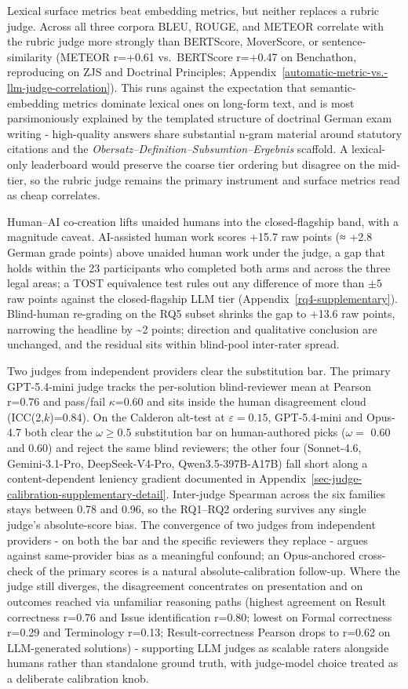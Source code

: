 \documentclass[11pt]{article}
\begin{document}
Lexical surface metrics beat embedding metrics, but neither replaces a
rubric judge. Across all three corpora BLEU, ROUGE, and METEOR correlate
with the rubric judge more strongly than BERTScore, MoverScore, or
sentence-similarity (METEOR r=+0.61 vs.~BERTScore r=+0.47 on Benchathon,
reproducing on ZJS and Doctrinal Principles;
Appendix~\ref{automatic-metric-vs.-llm-judge-correlation}). This runs
against the expectation that semantic-embedding metrics dominate lexical
ones on long-form text, and is most parsimoniously explained by the
templated structure of doctrinal German exam writing - high-quality
answers share substantial n-gram material around statutory citations and
the \emph{Obersatz--Definition--Subsumtion--Ergebnis} scaffold. A
lexical-only leaderboard would preserve the coarse tier ordering but
disagree on the mid-tier, so the rubric judge remains the primary
instrument and surface metrics read as cheap correlates.

Human--AI co-creation lifts unaided humans into the closed-flagship
band, with a magnitude caveat. AI-assisted human work scores +15.7 raw
points (≈ +2.8 German grade points) above unaided human work under the
judge, a gap that holds within the 23 participants who completed both
arms and across the three legal areas; a TOST equivalence test rules out
any difference of more than \(\pm 5\) raw points against the
closed-flagship LLM tier (Appendix~\ref{rq4-supplementary}). Blind-human
re-grading on the RQ5 subset shrinks the gap to +13.6 raw points,
narrowing the headline by \textasciitilde2 points; direction and
qualitative conclusion are unchanged, and the residual sits within
blind-pool inter-rater spread.

Two judges from independent providers clear the substitution bar. The
primary GPT-5.4-mini judge tracks the per-solution blind-reviewer mean
at Pearson r=0.76 and pass/fail \(\kappa\)=0.60 and sits inside the
human disagreement cloud (ICC(2,\(k\))=0.84). On the Calderon alt-test
at \(\varepsilon=0.15\), GPT-5.4-mini and Opus-4.7 both clear the
\(\omega \geq 0.5\) substitution bar on human-authored picks
(\(\omega=\) 0.60 and 0.60) and reject the same blind reviewers; the
other four (Sonnet-4.6, Gemini-3.1-Pro, DeepSeek-V4-Pro,
Qwen3.5-397B-A17B) fall short along a content-dependent leniency
gradient documented in
Appendix~\ref{sec-judge-calibration-supplementary-detail}. Inter-judge
Spearman across the six families stays between 0.78 and 0.96, so the
RQ1--RQ2 ordering survives any single judge's absolute-score bias. The
convergence of two judges from independent providers - on both the bar
and the specific reviewers they replace - argues against same-provider
bias as a meaningful confound; an Opus-anchored cross-check of the
primary scores is a natural absolute-calibration follow-up. Where the
judge still diverges, the disagreement concentrates on presentation and
on outcomes reached via unfamiliar reasoning paths (highest agreement on
Result correctness r=0.76 and Issue identification r=0.80; lowest on
Formal correctness r=0.29 and Terminology r=0.13; Result-correctness
Pearson drops to r=0.62 on LLM-generated solutions) - supporting LLM
judges as scalable raters alongside humans rather than standalone ground
truth, with judge-model choice treated as a deliberate calibration knob.
\end{document}
